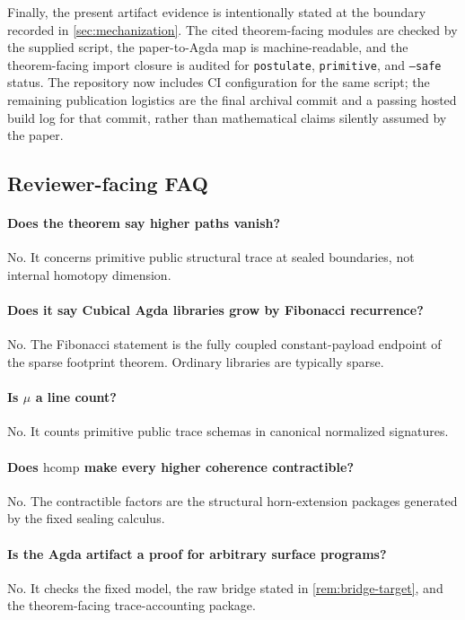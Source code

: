 \documentclass{lmcs}
\newcommand{\hcomp}{\mathrm{hcomp}}
\begin{document}
Finally, the present artifact evidence is intentionally stated at the boundary
recorded in \autoref{sec:mechanization}. The cited theorem-facing modules are
checked by the supplied script, the paper-to-Agda map is machine-readable, and
the theorem-facing import closure is audited for \texttt{postulate},
\texttt{primitive}, and \texttt{--safe} status. The repository now includes CI
configuration for the same script; the remaining publication logistics are the
final archival commit and a passing hosted build log for that commit, rather
than mathematical claims silently assumed by the paper.

\subsection{Reviewer-facing FAQ}
\label{subsec:faq}

\paragraph{Does the theorem say higher paths vanish?}
No. It concerns primitive public structural trace at sealed boundaries, not
internal homotopy dimension.

\paragraph{Does it say Cubical Agda libraries grow by Fibonacci recurrence?}
No. The Fibonacci statement is the fully coupled constant-payload endpoint of
the sparse footprint theorem. Ordinary libraries are typically sparse.

\paragraph{Is $\mu$ a line count?}
No. It counts primitive public trace schemas in canonical normalized
signatures.

\paragraph{Does $\hcomp$ make every higher coherence contractible?}
No. The contractible factors are the structural horn-extension packages
generated by the fixed sealing calculus.

\paragraph{Is the Agda artifact a proof for arbitrary surface programs?}
No. It checks the fixed model, the raw bridge stated in
\autoref{rem:bridge-target}, and the theorem-facing trace-accounting package.
\end{document}
